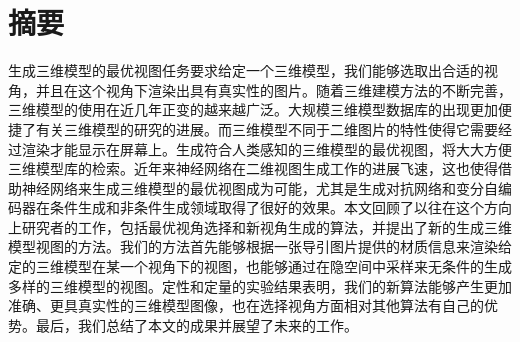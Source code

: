 \documentclass[UTF8,openany,AutoFakeBold,AutoFakeSlant,cs4size]{ctexbook}
\title{}
\author{}
\date{}
\begin{document}
\newcommand{\chineseTitle}{三维模型最优二维视图生成方法研究}
\newcommand{\englishTitle}{Synthesizing best 2D views of 3D models}
\newcommand{\name}{黄道吉}
\newcommand{\studentID}{1600017857}
\newcommand{\school}{元培学院}
\newcommand{\major}{计算机科学与技术}
\newcommand{\advisor}{连宙辉}

\clearpage




\quad
\setcounter{page}{0}
\thispagestyle{empty}
\clearpage



\pagestyle{fancy}
\normalsize
\linespread{1.5}\selectfont
\chapter*{摘要}

生成三维模型的最优视图任务要求给定一个三维模型，我们能够选取出合适的视角，并且在这个视角下渲染出具有真实性的图片。随着三维建模方法的不断完善，三维模型的使用在近几年正变的越来越广泛。大规模三维模型数据库的出现更加便捷了有关三维模型的研究的进展。而三维模型不同于二维图片的特性使得它需要经过渲染才能显示在屏幕上。生成符合人类感知的三维模型的最优视图，将大大方便三维模型库的检索。近年来神经网络在二维视图生成工作的进展飞速，这也使得借助神经网络来生成三维模型的最优视图成为可能，尤其是生成对抗网络和变分自编码器在条件生成和非条件生成领域取得了很好的效果。本文回顾了以往在这个方向上研究者的工作，包括最优视角选择和新视角生成的算法，并提出了新的生成三维模型视图的方法。我们的方法首先能够根据一张导引图片提供的材质信息来渲染给定的三维模型在某一个视角下的视图，也能够通过在隐空间中采样来无条件的生成多样的三维模型的视图。定性和定量的实验结果表明，我们的新算法能够产生更加准确、更具真实性的三维模型图像，也在选择视角方面相对其他算法有自己的优势。最后，我们总结了本文的成果并展望了未来的工作。

\bigskip
{}



{
	\fancyhf{} %



	\fancyfoot[CO,CE]{~\thepage~}

	\renewcommand{\headrulewidth}{0.7pt} %

	\renewcommand{\footrulewidth}{0pt} %
}
\end{document}

